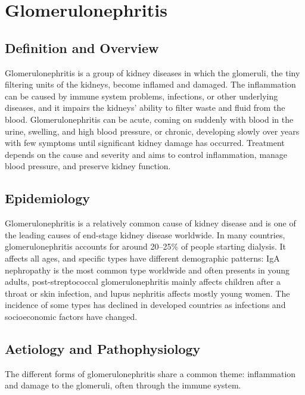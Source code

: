 \chapter{Glomerulonephritis}

\section*{Definition and Overview}
Glomerulonephritis is a group of kidney diseases in which the glomeruli, the tiny filtering units of the kidneys, become inflamed and damaged. The inflammation can be caused by immune system problems, infections, or other underlying diseases, and it impairs the kidneys' ability to filter waste and fluid from the blood. Glomerulonephritis can be acute, coming on suddenly with blood in the urine, swelling, and high blood pressure, or chronic, developing slowly over years with few symptoms until significant kidney damage has occurred. Treatment depends on the cause and severity and aims to control inflammation, manage blood pressure, and preserve kidney function.

\section*{Epidemiology}
Glomerulonephritis is a relatively common cause of kidney disease and is one of the leading causes of end-stage kidney disease worldwide. In many countries, glomerulonephritis accounts for around 20--25\% of people starting dialysis. It affects all ages, and specific types have different demographic patterns: IgA nephropathy is the most common type worldwide and often presents in young adults, post-streptococcal glomerulonephritis mainly affects children after a throat or skin infection, and lupus nephritis affects mostly young women. The incidence of some types has declined in developed countries as infections and socioeconomic factors have changed.

\section*{Aetiology and Pathophysiology}
The different forms of glomerulonephritis share a common theme: inflammation and damage to the glomeruli, often through the immune system.


